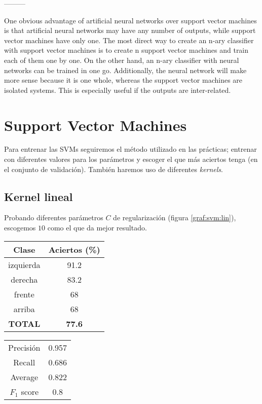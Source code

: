 \documentclass[titlepage]{article}
\begin{document}
\begin{multicols*}{2}
---------

One obvious advantage of artificial neural networks over support vector machines is that artificial neural networks may have any number of outputs, while support vector machines have only one. The most direct way to create an n-ary classifier with support vector machines is to create n support vector machines and train each of them one by one. On the other hand, an n-ary classifier with neural networks can be trained in one go. Additionally, the neural network will make more sense because it is one whole, whereas the support vector machines are isolated systems. This is especially useful if the outputs are inter-related.

\section{Support Vector Machines}
Para entrenar las SVMs seguiremos el método utilizado en las prácticas; entrenar con diferentes valores para los parámetros y escoger el que más aciertos tenga (en el conjunto de validación). También haremos uso de diferentes \textit{kernels}.

\subsection{Kernel lineal}
Probando diferentes parámetros $C$ de regularización (figura \ref{graf:svm:lin}), escogemos $10$ como el que da mejor resultado.

\begin{center}
\begin{tabular}{ |c|c| }
 \hline
 \textbf{Clase} & \textbf{Aciertos} (\%) \\
 \hline \hline
 izquierda & 91.2 \\
 derecha & 83.2 \\
 frente & 68 \\
 arriba & 68 \\
 \hline
 \textbf{TOTAL} & \textbf{77.6} \\
 \hline
\end{tabular}
\end{center}

\begin{center}
\begin{tabular}{ |c|c| }
 \hline
 Precisión & 0.957 \\
 Recall & 0.686 \\
 Average & 0.822 \\
 $F_1$ score & 0.8 \\
 \hline
\end{tabular}
\end{center}


\end{multicols*}
\end{document}
